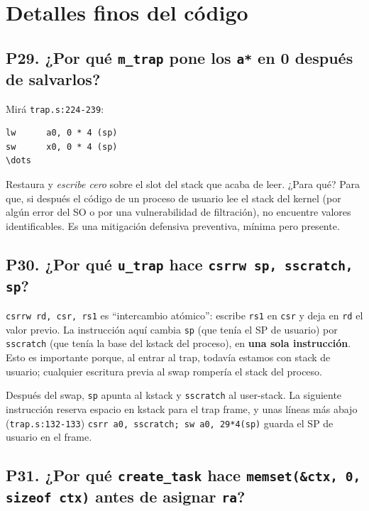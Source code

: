 \documentclass[11pt,a4paper]{article}
\begin{document}
\section{Detalles finos del código}

\subsection*{P29. ¿Por qué \texttt{m\_trap} pone los \texttt{a*} en 0 después de salvarlos?}

\begin{respuesta}
Mirá \texttt{trap.s:224-239}:

\begin{lstlisting}[style=asmstyle]
lw      a0, 0 * 4 (sp)
sw      x0, 0 * 4 (sp)
\dots
\end{lstlisting}

Restaura y \emph{escribe cero} sobre el slot del stack que acaba
de leer. ¿Para qué? Para que, si después el código de un proceso
de usuario lee el stack del kernel (por algún error del SO o por
una vulnerabilidad de filtración), no encuentre valores
identificables. Es una mitigación defensiva preventiva, mínima
pero presente.
\end{respuesta}

\subsection*{P30. ¿Por qué \texttt{u\_trap} hace \texttt{csrrw sp, sscratch, sp}?}

\begin{respuesta}
\texttt{csrrw rd, csr, rs1} es ``intercambio atómico'': escribe
\texttt{rs1} en \texttt{csr} y deja en \texttt{rd} el valor previo.
La instrucción aquí cambia \texttt{sp} (que tenía el SP de usuario)
por \texttt{sscratch} (que tenía la base del kstack del proceso),
en \textbf{una sola instrucción}. Esto es importante porque, al
entrar al trap, todavía estamos con stack de usuario; cualquier
escritura previa al swap rompería el stack del proceso.

Después del swap, \texttt{sp} apunta al kstack y \texttt{sscratch}
al user-stack. La siguiente instrucción reserva espacio en kstack
para el trap frame, y unas líneas más abajo
(\texttt{trap.s:132-133}) \texttt{csrr a0, sscratch; sw a0, 29*4(sp)}
guarda el SP de usuario en el frame.
\end{respuesta}

\subsection*{P31. ¿Por qué \texttt{create\_task} hace \texttt{memset(\&ctx, 0, sizeof ctx)} antes de asignar \texttt{ra}?}
\end{document}

